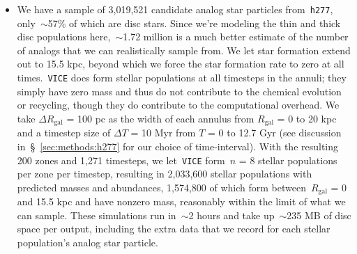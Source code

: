 \documentclass[fleqn, usenatbib]{mnras}
\begin{document}
\begin{itemize}
	\item We have a sample of 3,019,521 candidate analog star particles 
	from~\texttt{h277}, only~$\sim$57\% of which are disc stars. Since we're 
	modeling the thin and thick disc populations here,~$\sim$1.72 million is a 
	much better estimate of the number of analogs that we can realistically 
	sample from. We let star formation extend out to 15.5 kpc, beyond which 
	we force the star formation rate to zero at all times.~\texttt{VICE} does 
	form stellar populations at all timesteps in the annuli; they simply have 
	zero mass and thus do not contribute to the chemical evolution or 
	recycling, though they do contribute to the computational overhead. We 
	take $\Delta R_\text{gal}$ = 100 pc as the width of each annulus from 
	$R_\text{gal}$ = 0 to 20 kpc and a timestep size of $\Delta T$ = 10 Myr 
	from $T$ = 0 to 12.7 Gyr (see discussion in~\S~\ref{sec:methods:h277} for 
	our choice of time-interval). With the resulting 200 zones and 1,271 
	timesteps, we let~\texttt{VICE} form~$n$ = 8 stellar 
	populations per zone per timestep, resulting in 2,033,600 stellar 
	populations with predicted masses and abundances, 1,574,800 of which form 
	between~$R_\text{gal}$ = 0 and 15.5 kpc and have nonzero mass, reasonably 
	within the limit of what we can sample. These simulations run in~$\sim$2 
	hours and take up~$\sim$235 MB of disc space per output, including the 
	extra data that we record for each stellar population's analog star 
	particle. 
\end{itemize} 
\end{document}

